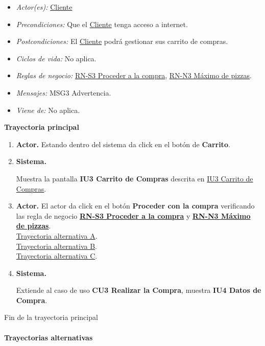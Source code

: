 \begin{itemize}
	
	\item \textit{Actor(es):} \hyperlink{A:Cliente}{Cliente}
	\item \textit{Precondiciones:} Que el \hyperlink{A:Cliente}{Cliente} tenga acceso a internet. 
	\item \textit{Postcondiciones:} El \hyperlink{A:Cliente}{Cliente} podrá gestionar sus carrito de compras.
	\item \textit{Ciclos de vida:} No aplica. 
	\item \textit{Reglas de negocio:} \hyperlink{RN:S3:ProcederCompra}{RN-S3 Proceder a la compra}, \hyperlink{RN:N3:Maximo}{RN-N3 Máximo de pizzas}.
	\item \textit{Mensajes:} MSG3 Advertencia.
	\item \textit{Viene de:} No aplica.
	
\end{itemize} 
		
\noindent \textbf{Trayectoria principal}

\begin{enumerate}
	
	\item {\textbf{Actor.}} Estando dentro del sistema da click en el botón de \textbf{Carrito}.
	
	\item \hypertarget{CU2:TP:P4}{\textbf{Sistema.}} Muestra la pantalla \textbf{IU3 Carrito de Compras} descrita en \hyperlink{IU3}{IU3 Carrito de Compras}.
	
	\item \textbf{Actor.} El actor da click en el botón  \textbf{Proceder con la compra} verificando las regla de negocio \hyperlink{RN:S3:ProcederCompra}{\textbf{RN-S3 Proceder a la compra}} y \hyperlink{RN:N3:Maximo}{\textbf{RN-N3 Máximo de pizzas}}.
	\\ \hyperlink{CU2:TAA}{Trayectoria alternativa A}.
	\\ \hyperlink{CU2:TAB}{Trayectoria alternativa B}. 
	\\ \hyperlink{CU2:TAC}{Trayectoria alternativa C}. 
	
	\item \hypertarget{CU1:TP:P4}{\textbf{Sistema.}} Extiende al caso de uso \textbf{CU3 Realizar la Compra}, muestra \textbf{IU4 Datos de Compra}.
	

\end{enumerate}	
Fin de la trayectoria principal
\\
\noindent \textbf{\\Trayectorias alternativas}

